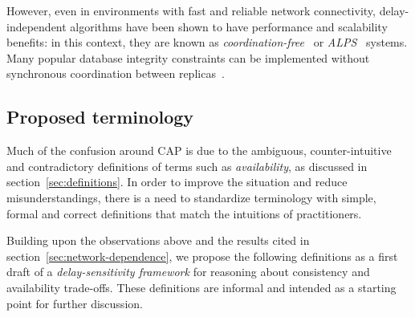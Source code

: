 \documentclass[a4paper,twocolumn,10pt]{article}
\begin{document}
However, even in environments with fast and reliable network connectivity, delay-independent
algorithms have been shown to have performance and scalability benefits: in this context, they are
known as \emph{coordination-free}~\cite{Bailis2014th} or \emph{ALPS}~\cite{Lloyd2011hz} systems.
Many popular database integrity constraints can be implemented without synchronous coordination
between replicas~\cite{Bailis2014th}.

\subsection{Proposed terminology}\label{sec:terminology}

Much of the confusion around CAP is due to the ambiguous, counter-intuitive and contradictory
definitions of terms such as \emph{availability}, as discussed in section~\ref{sec:definitions}. In
order to improve the situation and reduce misunderstandings, there is a need to standardize
terminology with simple, formal and correct definitions that match the intuitions of practitioners.

Building upon the observations above and the results cited in section~\ref{sec:network-dependence},
we propose the following definitions as a first draft of a \emph{delay-sensitivity framework} for
reasoning about consistency and availability trade-offs. These definitions are informal and intended
as a starting point for further discussion.
\end{document}
